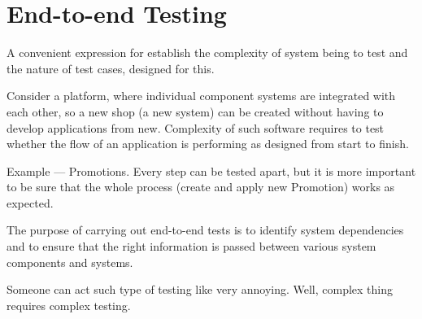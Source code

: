 \section{End-to-end Testing}
\label{sec:End-to-end Testing}

A convenient expression for establish the complexity of system being to test and the nature of test cases, designed for this.

Consider a platform, where individual component systems are integrated with each other, so a new shop (a new system) can be created without having to develop applications from new. Complexity of such software requires to test whether the flow of an application is performing as designed from start to finish.

Example — Promotions. Every step can be tested apart, but it is more important to be sure that the whole process (create and apply new Promotion) works as expected.

The purpose of carrying out end-to-end tests is to identify system dependencies and to ensure that the right information is passed between various system components and systems.

Someone can act such type of testing like very annoying. Well, complex thing requires complex testing.